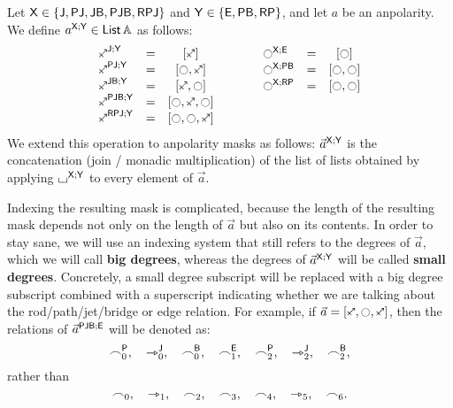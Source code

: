 \documentclass[a4paper]{memoir}
\begin{document}
\begin{definition}
	Let $\mathsf{X} \in \mathopen{}\left\{ \mathsf{J}, \mathsf{PJ}, \mathsf{JB}, \mathsf{PJB}, \mathsf{RPJ} \right\}\mathclose{}$ and $\mathsf{Y} \in \mathopen{}\left\{ \mathsf{E}, \mathsf{PB}, \mathsf{RP} \right\}\mathclose{}$, and let $a$ be an anpolarity.
	We define $a^{\mathsf{X};\mathsf{Y}} \in {\mathsf{List}}\,{\mathbb{A}}$ as follows:
	\[
		\begin{array}{l c c c l c c}
			\maskop \ypolar \maskj \mymasky &=& [\ypolar]
			&\qquad&
			\maskop \npolar \mymaskx \maske &=& [\npolar]
			\\
			\maskop \ypolar \maskpj \mymasky &=& [\npolar, \ypolar]
			&\qquad&
			\maskop \npolar \mymaskx \maskpb &=& [\npolar, \npolar]
			\\
			\maskop \ypolar \maskjb \mymasky &=& [\ypolar, \npolar]
			&\qquad&
			\maskop \npolar \mymaskx \maskrp &=& [\npolar, \npolar]
			\\
			\maskop \ypolar \maskpjb \mymasky &=& [\npolar, \ypolar, \npolar]
			\\
			\maskop \ypolar \maskrpj \mymasky &=& [\npolar, \npolar, \ypolar]
		\end{array}
	\]
	We extend this operation to anpolarity masks as follows: $\vec a^{\mathsf{X};\mathsf{Y}}$ is the concatenation (join / monadic multiplication) of the list of lists obtained by applying ${\llcorner\hspace{-.4ex}\lrcorner}^{\mathsf{X};\mathsf{Y}}$ to every element of $\vec a$.
	
	Indexing the resulting mask is complicated, because the length of the resulting mask depends not only on the length of $\vec a$ but also on its contents.
	In order to stay sane, we will use an indexing system that still refers to the degrees of $\vec a$, which we will call \textbf{big degrees}, whereas the degrees of $\vec a^{\mathsf{X};\mathsf{Y}}$ will be called \textbf{small degrees}.
	Concretely, a small degree subscript will be replaced with a big degree subscript combined with a superscript indicating whether we are talking about the rod/path/jet/bridge or edge relation.
	For example, if $\vec a = [\ypolar, \npolar, \ypolar]$, then the relations of $\vec a^{\mathsf{PJB};\mathsf{E}}$ will be denoted as:
	\[
		\frown^{\mathsf{P}}_0, \quad
		\rightarrowtriangle^{\mathsf{J}}_0, \quad
		\frown^{\mathsf{B}}_0, \quad
		\frown^{\mathsf{E}}_1, \quad
		\frown^{\mathsf{P}}_2, \quad
		\rightarrowtriangle^{\mathsf{J}}_2, \quad
		\frown^{\mathsf{B}}_2,
	\]
	rather than
	\[
		\frown_0, \quad
		\rightarrowtriangle_1, \quad
		\frown_2, \quad
		\frown_3, \quad
		\frown_4, \quad
		\rightarrowtriangle_5, \quad
		{\frown_6}.
	\]
\end{definition}
\end{document}
